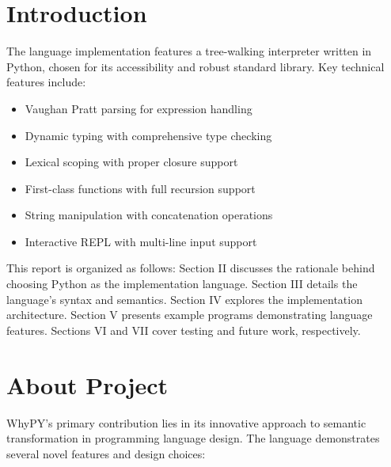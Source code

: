 \documentclass[conference]{IEEEtran}
\begin{document}
\section{Introduction}
The language implementation features a tree-walking interpreter written in Python, chosen for its accessibility and robust standard library. Key technical features include:
\begin{itemize}
    \item Vaughan Pratt parsing for expression handling
    \item Dynamic typing with comprehensive type checking
    \item Lexical scoping with proper closure support
    \item First-class functions with full recursion support
    \item String manipulation with concatenation operations
    \item Interactive REPL with multi-line input support
\end{itemize}

This report is organized as follows: Section II discusses the rationale behind choosing Python as the implementation language. Section III details the language's syntax and semantics. Section IV explores the implementation architecture. Section V presents example programs demonstrating language features. Sections VI and VII cover testing and future work, respectively.


\section{About Project}
WhyPY's primary contribution lies in its innovative approach to semantic transformation in programming language design. The language demonstrates several novel features and design choices:
\end{document}
